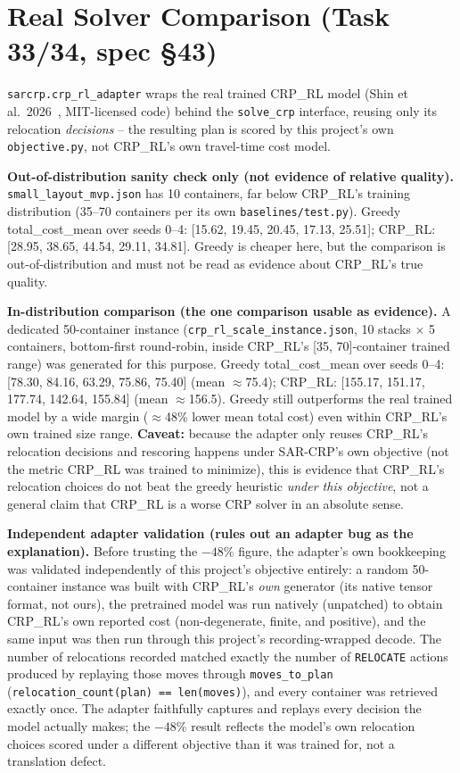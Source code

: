 \documentclass[11pt]{article}
\begin{document}
\section{Real Solver Comparison (Task 33/34, spec \S43)}
\label{sec:real-solver}

\texttt{sarcrp.crp\_rl\_adapter} wraps the real trained CRP\_RL model
(Shin et al.\ 2026~\cite{shin2026}, MIT-licensed code) behind the \texttt{solve\_crp}
interface, reusing only its relocation \emph{decisions} -- the resulting
plan is scored by this project's own \texttt{objective.py}, not CRP\_RL's
own travel-time cost model.

\textbf{Out-of-distribution sanity check only (not evidence of relative
quality).} \texttt{small\_layout\_mvp.json} has 10 containers, far below
CRP\_RL's training distribution (35--70 containers per its own
\texttt{baselines/test.py}). Greedy total\_cost\_mean over seeds 0--4:
[15.62, 19.45, 20.45, 17.13, 25.51]; CRP\_RL: [28.95, 38.65, 44.54, 29.11,
34.81]. Greedy is cheaper here, but the comparison is out-of-distribution
and must not be read as evidence about CRP\_RL's true quality.

\textbf{In-distribution comparison (the one comparison usable as
evidence).} A dedicated 50-container instance
(\texttt{crp\_rl\_scale\_instance.json}, 10 stacks $\times$ 5 containers,
bottom-first round-robin, inside CRP\_RL's [35, 70]-container trained
range) was generated for this purpose. Greedy total\_cost\_mean over
seeds 0--4: [78.30, 84.16, 63.29, 75.86, 75.40] (mean $\approx$75.4);
CRP\_RL: [155.17, 151.17, 177.74, 142.64, 155.84] (mean $\approx$156.5).
Greedy still outperforms the real trained model by a wide margin
($\approx$48\% lower mean total cost) even within CRP\_RL's own trained
size range. \textbf{Caveat:} because the adapter only reuses CRP\_RL's
relocation decisions and rescoring happens under SAR-CRP's own objective
(not the metric CRP\_RL was trained to minimize), this is evidence that
CRP\_RL's relocation choices do not beat the greedy heuristic \emph{under
this objective}, not a general claim that CRP\_RL is a worse CRP solver
in an absolute sense.

\textbf{Independent adapter validation (rules out an adapter bug as the
explanation).} Before trusting the $-48\%$ figure, the adapter's own
bookkeeping was validated independently of this project's objective
entirely: a random 50-container instance was built with CRP\_RL's
\emph{own} generator (its native tensor format, not ours), the pretrained
model was run natively (unpatched) to obtain CRP\_RL's own reported cost
(non-degenerate, finite, and positive), and the same input was then run
through this project's recording-wrapped decode. The number of relocations
recorded matched exactly the number of \texttt{RELOCATE} actions produced
by replaying those moves through \texttt{moves\_to\_plan}
(\texttt{relocation\_count(plan) == len(moves)}), and every container was
retrieved exactly once. The adapter faithfully captures and replays every
decision the model actually makes; the $-48\%$ result reflects the model's
own relocation choices scored under a different objective than it was
trained for, not a translation defect.
\end{document}
